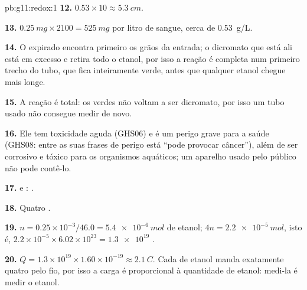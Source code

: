 \begin{solution}{pb:g11:redox:1}
\textbf{12.} $0.53 \times 10 \approx \qty{5.3}{cm}$.

\textbf{13.} $\qty{0.25}{mg} \times 2100 = \qty{525}{mg}$ por litro de
sangue, cerca de \qty{0.53}{g/L}.

\textbf{14.} O  expirado encontra primeiro os grãos da entrada; o
dicromato que está ali está em excesso e retira todo o etanol, por isso
a reação é completa num primeiro trecho do tubo, que fica inteiramente
verde, antes que qualquer etanol chegue mais longe.

\textbf{15.} A reação é total: os   verdes não voltam a
ser dicromato, por isso um tubo usado não consegue medir de novo.

\textbf{16.} Ele tem toxicidade aguda (GHS06) e é um perigo grave para a
saúde (GHS08: entre as suas frases de perigo está ``pode provocar
câncer''), além de ser corrosivo e tóxico para os organismos aquáticos;
um aparelho usado pelo público não pode contê-lo.

\textbf{17.}  e
:
.

\textbf{18.} Quatro .

\textbf{19.} $n = 0.25\times 10^{-3}/46.0 = \qty{5.4e-6}{mol}$ de
etanol;  $4n = \qty{2.2e-5}{mol}$, isto é,
$2.2\times 10^{-5}\times 6.02\times 10^{23} = \num{1.3e19}$ .

\textbf{20.} $Q = 1.3\times 10^{19}\times 1.60\times 10^{-19} \approx
\qty{2.1}{C}$. Cada  de etanol manda exatamente quatro 
pelo fio, por isso a carga é proporcional à quantidade de etanol: medi-la
é medir o etanol.
\end{solution}
